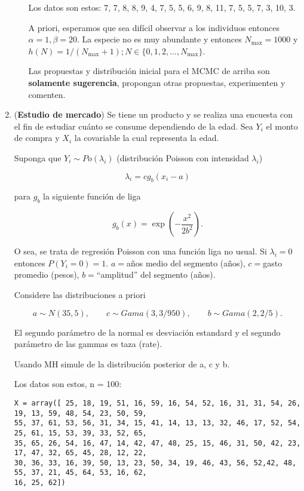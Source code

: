 \documentclass{article}
\begin{document}
\begin{enumerate}
\begin{itemize}
    Los datos son estos: 7, 7, 8, 8, 9, 4, 7, 5, 5, 6, 9, 8, 11, 7, 5, 5, 7, 3, 10, 3.
    
    A priori, esperamos que sea difícil observar a los individuos entonces $\alpha = 1, \beta = 20$. La especie no es muy abundante y entonces $N_{\max} = 1000$ y $h(N ) = 1/(N_{\max} + 1); N \in \{0, 1, 2, . . . , N_{\max}\}$.

    Las propuestas y distribución inicial para el MCMC de arriba son \textbf{solamente sugerencia}, propongan otras propuestas, experimenten y comenten.
    \end{itemize}


    \item (\textbf{Estudio de mercado}) Se tiene un producto y se realiza una encuesta con el fin de estudiar cuánto se consume dependiendo de la edad. Sea $Y_i$ el monto de compra y $X_i$ la covariable la cual representa la edad.
    
    Suponga que $Y_i \sim Po(\lambda_i)$ (distribución Poisson con intensidad $\lambda_i$)
    
    \[\lambda_i = cg_b(x_i - a)\]

    para $g_b$ la siguiente función de liga 
    
    \[ g_b(x) = \exp\left(- \frac{x^2}{2b^2}\right) .\]

    O sea, se trata de regresión Poisson con una función liga no usual. Si $\lambda_i = 0$ entonces $P(Y_i = 0) = 1$. $a = $años medio del segmento (años), $c = $gasto promedio (pesos), $b = $``amplitud'' del segmento (años).

    Considere las distribuciones a priori
    
    \[a \sim N (35, 5), \qquad c \sim Gama(3, 3/950), \qquad b \sim Gama(2, 2/5).\]
    
    El segundo parámetro de la normal es desviación estandard y el segundo parámetro de las gammas es taza (rate).
    
    Usando MH simule de la distribución posterior de a, c y b.
    
    Los datos son estos, n = 100:

\begin{verbatim}
X = array([ 25, 18, 19, 51, 16, 59, 16, 54, 52, 16, 31, 31, 54, 26, 19, 13, 59, 48, 54, 23, 50, 59, 
55, 37, 61, 53, 56, 31, 34, 15, 41, 14, 13, 13, 32, 46, 17, 52, 54, 25, 61, 15, 53, 39, 33, 52, 65, 
35, 65, 26, 54, 16, 47, 14, 42, 47, 48, 25, 15, 46, 31, 50, 42, 23, 17, 47, 32, 65, 45, 28, 12, 22, 
30, 36, 33, 16, 39, 50, 13, 23, 50, 34, 19, 46, 43, 56, 52,42, 48, 55, 37, 21, 45, 64, 53, 16, 62, 
16, 25, 62])


\end{verbatim}
\end{enumerate}
\end{document}

